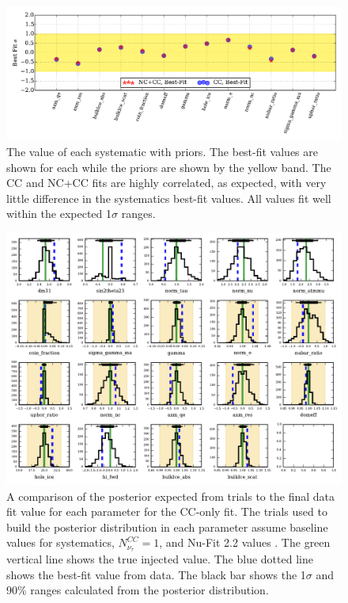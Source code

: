 \begin{figure}{}
	\centering \includegraphics[width=\textwidth]{pulls.pdf}
	\caption[The best fit value of each systematic with priors]{The value of each systematic with priors. The best-fit values are shown for each while the priors are shown by the yellow band. The CC and NC+CC fits are highly correlated, as expected, with very little difference in the systematics best-fit values. All values fit well within the expected 1$\sigma$ ranges.}
	\label{fig:syst_pulls}
\end{figure}

\begin{figure}{}
	\centering \includegraphics[width=\textwidth]{cc_systematics.pdf}
	\caption[The CC-only posterior distributions expected compared to final fit values]{A comparison of the posterior expected from trials to the final data fit value for each parameter for the CC-only fit. The trials used to build the posterior distribution in each parameter assume baseline values for systematics, $N_{\nu_\tau}^{CC}=1$, and Nu-Fit 2.2 values \cite{NuFit_2.2}. The green vertical line shows the true injected value. The blue dotted line shows the best-fit value from data. The black bar shows the 1$\sigma$ and 90\% ranges calculated from the posterior distribution.}
	\label{fig:posteriors_cc}
\end{figure}

